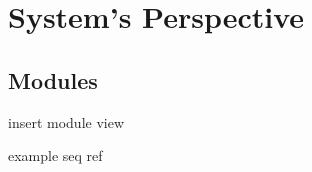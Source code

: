 \section{System's Perspective}
\label{ch:sys_persp} 

\subsection{Modules}
insert module view

example seq ref \cite{seq}

